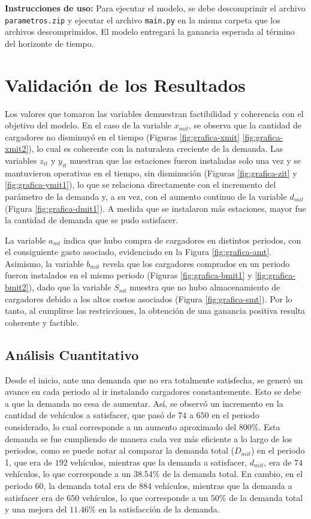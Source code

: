 \documentclass[letterpaper]{article}
\begin{document}
\begin{flushleft}
	\textbf{Instrucciones de uso:} Para ejecutar el modelo, se debe descomprimir el archivo \texttt{parametros.zip} y ejecutar el archivo \texttt{main.py} en la misma carpeta que los archivos descomprimidos. El modelo entregará la ganancia esperada al término del horizonte de tiempo.

	\section{Validación de los Resultados}

	Los valores que tomaron las variables demuestran factibilidad y coherencia con el objetivo del modelo. En el caso de la variable \(x_{mit}\), se observa que la cantidad de cargadores no disminuyó en el tiempo (Figuras \ref{fig:grafica-xmit} \ref{fig:grafica-xmit2}), lo cual es coherente con la naturaleza creciente de la demanda. Las variables \(z_{it}\) y \(y_{it}\) muestran que las estaciones fueron instaladas solo una vez y se mantuvieron operativas en el tiempo, sin disminución (Figuras \ref{fig:grafica-zit} y \ref{fig:grafica-ymit1}), lo que se relaciona directamente con el incremento del parámetro de la demanda y, a su vez, con el aumento continuo de la variable \(d_{mit}\) (Figura \ref{fig:grafica-dmit1}). A medida que se instalaron más estaciones, mayor fue la cantidad de demanda que se pudo satisfacer.

	La variable \(a_{mt}\) indica que hubo compra de cargadores en distintos periodos, con el consiguiente gasto asociado, evidenciado en la Figura \ref{fig:grafica-amt}. Asimismo, la variable \(b_{mit}\) revela que los cargadores comprados en un periodo fueron instalados en el mismo periodo (Figuras \ref{fig:grafica-bmit1} y \ref{fig:grafica-bmit2}), dado que la variable \(S_{mt}\) muestra que no hubo almacenamiento de cargadores debido a los altos costos asociados (Figura \ref{fig:grafica-smt}). Por lo tanto, al cumplirse las restricciones, la obtención de una ganancia positiva resulta coherente y factible.

	\subsection{Análisis Cuantitativo}

	Desde el inicio, ante una demanda que no era totalmente satisfecha, se generó un avance en cada
	periodo al ir instalando cargadores constantemente. Esto se debe a que la demanda no cesa de
	aumentar. Así, se observó un incremento en la cantidad de vehículos a satisfacer, que pasó de
	$74$ a $650$ en el periodo considerado, lo cual corresponde a un aumento aproximado del $800\%$.
	Esta demanda se fue cumpliendo de manera cada vez más eficiente a lo largo de los periodos,
	como se puede notar al comparar la demanda total ($D_{mit}$) en el periodo 1, que era de $192$ 
	vehículos, mientras que la demanda a satisfacer, $d_{mit}$, era de $74$ vehículos, lo que corresponde 
	a un $38.54\%$ de la demanda total. En cambio, en el periodo 60, la demanda total era de $884$ vehículos, 
	mientras que la demanda a satisfacer era de $650$ vehículos, lo que corresponde a un $50\%$ de la 
	demanda total y una mejora del $11.46\%$ en la satisfacción de la demanda.


\end{flushleft}
\end{document}
